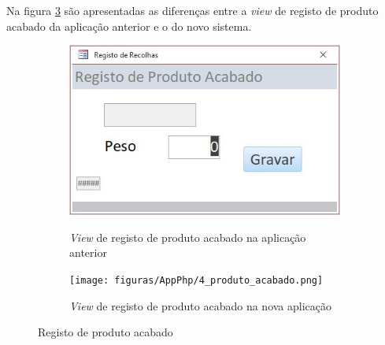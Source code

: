 \newpage
Na figura \ref{fig:comparacao_prodacabado} são apresentadas as diferenças entre a \textit{view} de registo de produto acabado da aplicação anterior e o do novo sistema.
\begin{figure}[H]
	\centering
	
	\begin{subfigure}[t]{0.45\linewidth}
		\includegraphics[width=\linewidth]{figuras/AppAccess/4-ProdutoAcabado.jpg}
		\label{fig:comparacao_prodacabado_1}
		\caption{\textit{View} de registo de produto acabado na aplicação anterior}
	\end{subfigure}
	\begin{subfigure}[t]{0.45\linewidth}
		\texttt{[image: figuras/AppPhp/4\_produto\_acabado.png]}
		\label{fig:comparacao_prodacabado_2}
		\caption{\textit{View} de registo de produto acabado na nova aplicação}
	\end{subfigure}
	
	\caption{Registo de produto acabado}
	\label{fig:comparacao_prodacabado}
\end{figure}


